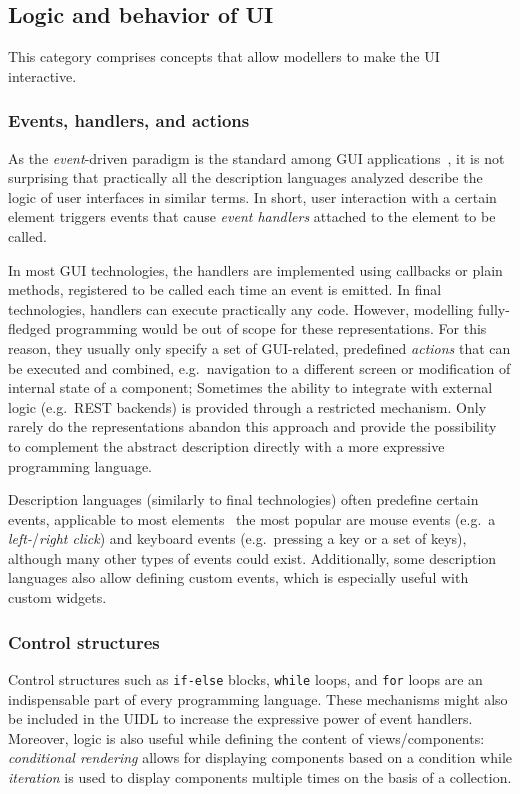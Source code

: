 \subsection{Logic and behavior of UI}\label{subsec:logic-and-behavior-of-ui}

This category comprises concepts that allow modellers to make the UI interactive.

\subsubsection{Events, handlers, and actions}
As the \emph{event}-driven paradigm is the standard among GUI applications~\cite{wang2016event}, it is not surprising that practically all the description languages analyzed describe the logic of user interfaces in similar terms.
In short, user interaction with a certain element triggers events that cause \emph{event handlers} attached to the element to be called.

In most GUI technologies, the handlers are implemented using callbacks or plain methods, registered to be called each time an event is emitted.
In final technologies, handlers can execute practically any code.
However, modelling fully-fledged programming would be out of scope for these representations.
For this reason, they usually only specify a set of GUI-related, predefined \emph{actions} that can be executed and combined, e.g.\ navigation to a different screen or modification of internal state of a component;
Sometimes the ability to integrate with external logic (e.g.\ REST backends) is provided through a restricted mechanism.
Only rarely do the representations abandon this approach and provide the possibility to complement the abstract description directly with a more expressive programming language.

Description languages (similarly to final technologies) often predefine certain events, applicable to most elements \textendash\ the most popular are mouse events (e.g.\ a \emph{left-}/\emph{right click}) and keyboard events (e.g.\ pressing a key or a set of keys), although many other types of events could exist.
Additionally, some description languages also allow defining custom events, which is especially useful with custom widgets.

\subsubsection{Control structures}
Control structures such as \texttt{if-else} blocks, \texttt{while} loops, and \texttt{for} loops are an indispensable part of every programming language.
These mechanisms might also be included in the UIDL to increase the expressive power of event handlers.
Moreover, logic is also useful while defining the content of views/components: \emph{conditional rendering} allows for displaying components based on a condition while \emph{iteration} is used to display components multiple times on the basis of a collection.

